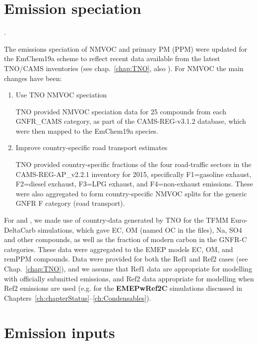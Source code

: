 \section{Emission speciation}
\label{sec:emissplits}.



The emissions speciation of NMVOC and primary PM (PPM) were updated
for the EmChem19a scheme to reflect recent data available from
the latest TNO/CAMS inventories (see chap.~\ref{chap:TNO}, also
\citealt{CAMSemis2019}).  For NMVOC the main changes have been:

\begin{enumerate}
  \item Use TNO NMVOC speciation

    TNO provided NMVOC speciation data for 25 compounds from each
    GNFR\_CAMS category, as part of the CAMS-REG-v3.1.2 database,
    which were then mapped to the EmChem19a species.

  \item Improve country-specific road transport estimates

    TNO provided country-specific fractions of the four road-traffic
    sectors in the CAMS-REG-AP\_v2.2.1 inventory for 2015, specifically
    F1=gasoline exhaust, F2=diesel exchaust, F3=LPG exhaust, and
    F4=non-exhaust emissions. These were also aggregated to form
    country-specific NMVOC splits for the generic GNFR F category
    (road transport).

\end{enumerate}


For \pmfine and \pmten, we made use of country-data generated by TNO for
the TFMM Euro-DeltaCarb simulations, which gave EC, OM (named
OC in the files), Na, SO4 and other compounds, as well as the fraction
of modern carbon in the GNFR-C categories. These data were aggregated
to the EMEP models EC, OM, and remPPM compounds. Data were provided for
both the Ref1 and Ref2 cases (see Chap.~\ref{chap:TNO}), and we assume
that Ref1 data are appropriate for modelling with officially submitted
emissions, and Ref2 data appropriate for modelling when Ref2 emissions
are used (e.g. for the \textbf{EMEPwRef2C} simulations discussed in
Chapters~\ref{ch:chapterStatus}--\ref{ch:Condensables}).


\section{Emission inputs}
\label{sec:EmisInp}

